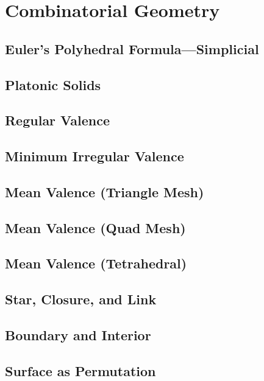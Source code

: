 \setcounter{chapter}{-1}
\chapter{Combinatorial Geometry}

\section{Euler’s Polyhedral Formula—Simplicial}

\section{Platonic Solids}

\section{Regular Valence}

\section{Minimum Irregular Valence}

\section{Mean Valence (Triangle Mesh)}

\section{Mean Valence (Quad Mesh)}

\section{Mean Valence (Tetrahedral)}

\section{Star, Closure, and Link}

\section{Boundary and Interior}

\section{Surface as Permutation}

